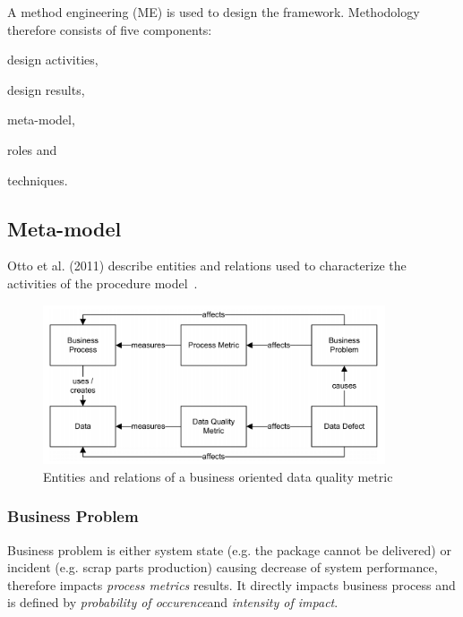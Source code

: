 A method engineering (ME) is used to design the framework.
Methodology therefore consists of five components:
\begin{enumerate*}[label=(\roman*)]
    \item design activities,
    \item design results,
    \item meta-model,
    \item roles and
    \item techniques.
\end{enumerate*}

\subsection{Meta-model}

Otto et al. (2011) describe entities and relations used to characterize the activities of the procedure model~\cite{otto2011}.

\begin{figure}[htb]
    \centering
    \includegraphics[width=0.9\textwidth]{figures/otto-figure-1.png}
    \caption{Entities and relations of a business oriented data quality metric~\cite{otto2011}}
    \label{fig:otto-figure-1}
\end{figure}
\FloatBarrier

\subsubsection{Business Problem}

Business problem is either system state (e.g. the package cannot be delivered) or incident (e.g. scrap parts production) causing decrease of system performance, therefore impacts \textit{process metrics} results.
It directly impacts business process and is defined by \textit{probability of occurence}\footnotemark and \textit{intensity of impact}\footnotemark.


